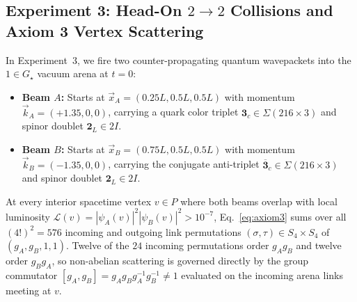 \documentclass[11pt,a4paper]{article}
\theoremstyle{definition}
\theoremstyle{remark}
\newcommand{\Gstar}{G_\star}
\begin{document}
\subsection{Experiment 3: Head-On \texorpdfstring{$2 \to 2$}{2 -> 2} Collisions and Axiom 3 Vertex Scattering}

In Experiment~3, we fire two counter-propagating quantum wavepackets into the $1 \in \Gstar$ vacuum arena at $t = 0$:
\begin{itemize}
    \item \textbf{Beam $A$:} Starts at $\vec{x}_A = (0.25 L, 0.5 L, 0.5 L)$ with momentum $\vec{k}_A = (+1.35, 0, 0)$, carrying a quark color triplet $\mathbf{3}_c \in \Sigma(216\times 3)$ and spinor doublet $\mathbf{2}_L \in 2I$.
    \item \textbf{Beam $B$:} Starts at $\vec{x}_B = (0.75 L, 0.5 L, 0.5 L)$ with momentum $\vec{k}_B = (-1.35, 0, 0)$, carrying the conjugate anti-triplet $\overline{\mathbf{3}}_c \in \Sigma(216\times 3)$ and spinor doublet $\mathbf{2}_L \in 2I$.
\end{itemize}
At every interior spacetime vertex $v \in P$ where both beams overlap with local luminosity $\mathcal{L}(v) = |\psi_A(v)|^2 |\psi_B(v)|^2 > 10^{-7}$, Eq.~\eqref{eq:axiom3} sums over all $(4!)^2 = 576$ incoming and outgoing link permutations $(\sigma, \tau) \in S_4 \times S_4$ of $(g_A, g_B, 1, 1)$. Twelve of the $24$ incoming permutations order $g_A g_B$ and twelve order $g_B g_A$, so non-abelian scattering is governed directly by the group commutator $[g_A, g_B] = g_A g_B g_A^{-1} g_B^{-1} \neq 1$ evaluated on the incoming arena links meeting at $v$.

\begin{table}[!htbp]
\centering
\caption{Experiment 3: ``Miniature LHC'' head-on $2 \to 2$ quantum wavepacket collisions at $L = 10$.}
\label{tab:lhc_collision}
\end{table}
\end{document}
